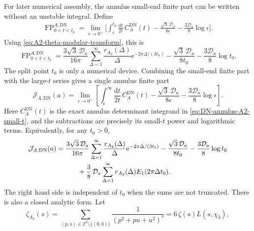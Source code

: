 \documentclass[11pt]{article}
\newcommand{\Z}{\mathbb{Z}}
\newcommand{\DN}{\mathrm{DN}}
\newcommand{\dd}{\mathrm{d}}
\newcommand{\e}{\mathrm{e}}
\begin{document}
For later numerical assembly, the annulus small-end finite part can be written without an
unstable integral. Define
\begin{align}
  \operatorname{FP}_{0<t<t_0}^{A,\DN}
  =
  \lim_{\epsilon\to0^+}
  \bigg[
    \int_{\epsilon}^{t_0}\frac{\dd t}{2t}\,C_A^{\DN}(t)
    -\frac{\sqrt3\,\mathcal D_a}{8\epsilon}
    -\frac{3\mathcal D_a}{8}\log\epsilon
  \bigg].
  \label{eq:DN-annulus-A2-small-finite-part}
\end{align}
Using \eqref{eq:A2-theta-modular-transform}, this is
\begin{equation}
  \operatorname{FP}_{0<t<t_0}^{A,\DN}
  =
  \frac{3\sqrt3\,\mathcal D_a}{16\pi}
  \sum_{\Delta=1}^{\infty}
  \frac{r_{A_2}(\Delta)}{\Delta}
  \e^{-2\pi\Delta/(3t_0)}
  -
  \frac{\sqrt3\,\mathcal D_a}{8t_0}
  -
  \frac{3\mathcal D_a}{8}\log t_0 .
  \label{eq:DN-annulus-A2-small-finite-part-sum}
\end{equation}
The split point \(t_0\) is only a numerical device. Combining the small-end finite part with
the large-\(t\) series gives a single annulus finite part
\begin{equation}
  \mathcal J_{A,\DN}(a)
  =
  \lim_{\epsilon\to0^+}
  \left[
    \int_{\epsilon}^{\infty}\frac{\dd t}{2t}\,C_A^{\DN}(t)
    -\frac{\sqrt3\,\mathcal D_a}{8\epsilon}
    -\frac{3\mathcal D_a}{8}\log\epsilon
  \right].
  \label{eq:DN-annulus-A2-total-finite-definition}
\end{equation}
Here \(C_A^{\DN}(t)\) is the exact annulus determinant integrand in
\eqref{eq:DN-annulus-A2-small-t}, and the subtractions are precisely its small-\(t\)
power and logarithmic terms. Equivalently, for any \(t_0>0\),
\begin{align}
  \mathcal J_{A,\DN}(a)
  &=
  \frac{3\sqrt3\,\mathcal D_a}{16\pi}
  \sum_{\Delta=1}^{\infty}
  \frac{r_{A_2}(\Delta)}{\Delta}
  \e^{-2\pi\Delta/(3t_0)}
  -
  \frac{\sqrt3\,\mathcal D_a}{8t_0}
  -
  \frac{3\mathcal D_a}{8}\log t_0
  \notag\\
  &\hspace{1.1cm}
  +
  \frac38\,\mathcal D_a
  \sum_{\Delta=1}^{\infty}
  r_{A_2}(\Delta)E_1(2\pi\Delta t_0).
  \label{eq:DN-annulus-A2-total-finite-split}
\end{align}
The right hand side is independent of \(t_0\) when the sums are not truncated. There is also a
closed analytic form. Let
\begin{equation}
  \zeta_{A_2}(s)
  =
  \sum_{(p,u)\in\Z^2\setminus\{(0,0)\}}
  \frac{1}{(p^2+pu+u^2)^s}
  =
  6\,\zeta(s)L(s,\chi_3),
  \label{eq:A2-epstein-zeta}
\end{equation}
\end{document}
